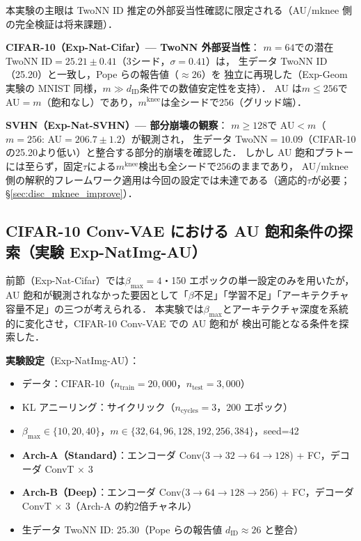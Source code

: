 \documentclass[11pt,a4paper]{jsarticle}
\newcommand{\mknee}{m^{\mathrm{knee}}}
\begin{document}
本実験の主眼は TwoNN ID 推定の外部妥当性確認に限定される（AU/mknee 側の完全検証は将来課題）．

\textbf{CIFAR-10（Exp-Nat-Cifar）— TwoNN 外部妥当性}：
$m=64$での潜在 TwoNN ID$=25.21\pm0.41$（3シード，$\sigma=0.41$）は，
生データ TwoNN ID（25.20）と一致し，Pope ら\cite{pope2021intrinsic}の報告値（$\approx 26$）を
独立に再現した（Exp-Geom 実験の MNIST 同様，$m \gg d_\mathrm{ID}$条件での数値安定性を支持）．
AU は$m \leq 256$で AU$=m$（飽和なし）であり，$\mknee$は全シードで256（グリッド端）．

\textbf{SVHN（Exp-Nat-SVHN）— 部分崩壊の観察}：
$m \geq 128$で AU$<m$（$m=256$: AU$=206.7\pm1.2$）が観測され，
生データ TwoNN$=10.09$（CIFAR-10の25.20より低い）と整合する部分的崩壊を確認した．
しかし AU 飽和プラトーには至らず，固定$\tau$による$\mknee$検出も全シードで256のままであり，
AU/mknee 側の解釈的フレームワーク適用は今回の設定では未達である（適応的$\tau$が必要；§\ref{sec:disc_mknee_improve}）．

\subsection{CIFAR-10 Conv-VAE における AU 飽和条件の探索（実験 Exp-NatImg-AU）}\label{sec:exp_natimg_au}

前節（Exp-Nat-Cifar）では$\beta_{\max}=4$・150 エポックの単一設定のみを用いたが，
AU 飽和が観測されなかった要因として「$\beta$不足」「学習不足」「アーキテクチャ容量不足」の三つが考えられる．
本実験では$\beta_{\max}$とアーキテクチャ深度を系統的に変化させ，CIFAR-10 Conv-VAE での AU 飽和が
検出可能となる条件を探索した．

\textbf{実験設定}（Exp-NatImg-AU）：
\begin{itemize}
  \item データ：CIFAR-10（$n_{\mathrm{train}}=20{,}000$，$n_{\mathrm{test}}=3{,}000$）
  \item KL アニーリング：サイクリック（$n_{\mathrm{cycles}}=3$，200 エポック）
  \item $\beta_{\max} \in \{10, 20, 40\}$，$m \in \{32, 64, 96, 128, 192, 256, 384\}$，seed=42
  \item \textbf{Arch-A（Standard）}：エンコーダ Conv($3{\to}32{\to}64{\to}128$) + FC，デコーダ ConvT × 3
  \item \textbf{Arch-B（Deep）}：エンコーダ Conv($3{\to}64{\to}128{\to}256$) + FC，デコーダ ConvT × 3（Arch-A の約2倍チャネル）
  \item 生データ TwoNN ID: $25.30$（Pope ら\cite{pope2021intrinsic}の報告値 $d_\mathrm{ID} \approx 26$ と整合）
\end{itemize}
\end{document}
